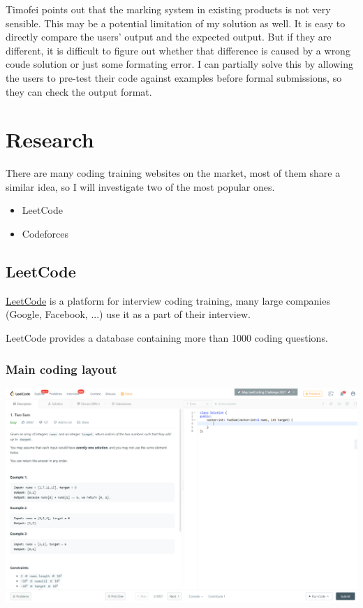 \documentclass[a4paper]{report}
\begin{document}
Timofei points out that the marking system in existing products is not very sensible. This may be a potential limitation of my solution as well. It is easy to directly compare the users' output and the expected output. But if they are different, it is difficult to figure out whether that difference is caused by a wrong coude solution or just some formating error. I can partially solve this by allowing the users to pre-test their code against examples before formal submissions, so they can check the output format. 

\section{Research}

There are many coding training websites on the market, most of them share a similar idea, so I will investigate two of the most popular ones.

\begin{itemize}
    \item LeetCode
    \item Codeforces
\end{itemize}

\subsection{LeetCode}

\href{https://leetcode.com/}{LeetCode} is a platform for interview coding training, many large companies (Google, Facebook, ...) use it as a part of their interview.

LeetCode provides a database containing more than 1000 coding questions.

\subsubsection{Main coding layout}
\includegraphics[width=\linewidth]{Two-Sum-LeetCode-Coding}
\end{document}
